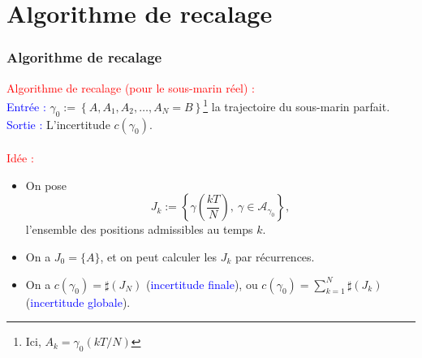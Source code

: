 \documentclass[11pt]{beamer}
\begin{document}
\section{Algorithme  de recalage}
\begin{frame}

\frametitle{Algorithme de recalage}


\textcolor{red}{Algorithme de recalage (pour le sous-marin réel) :}\\
\indent \textcolor{blue}{Entrée : } $\gamma_0 := \left\{ A, A_1, A_2, \ldots, A_N = B \right\}$\footnote{Ici, $A_k = \gamma_0(kT/N)$} la trajectoire du sous-marin parfait.\\
\indent \textcolor{blue}{Sortie : } L'incertitude $c(\gamma_0)$.\\
~\\

\textcolor{red}{Idée :}
\begin{itemize}
	\item On pose 
	\[
		J_k := \left\{ \gamma \left(\dfrac{kT}{N} \right), \ \gamma \in \mathcal{A}_{\gamma_0} \right\},
	\]
	l'ensemble des positions admissibles au temps $k$.
	\item On a $J_0 = \{ A \}$, et on peut calculer les $J_k$ par récurrences.
	\item On a $c(\gamma_0) = \sharp \left( J_N \right)$ (\textcolor{blue}{incertitude finale}), ou $c(\gamma_0) = \sum_{k=1}^N \sharp \left( J_k \right)$ (\textcolor{blue}{incertitude globale}).
\end{itemize}



\end{frame}



\end{document}
